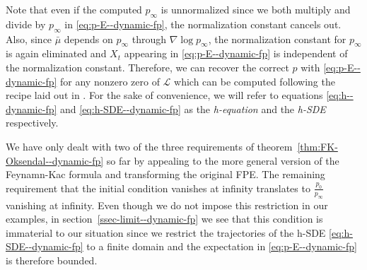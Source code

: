 Note that even if the computed $p_\infty$ is unnormalized since we both multiply and divide by $p_\infty$ in \eqref{eq:p-E--dynamic-fp}, the normalization constant cancels out. Also, since $\bar\mu$ depends on $p_\infty$ through $\nabla\log p_\infty$, the normalization constant for $p_\infty$ is again eliminated and $X_t$ appearing in \eqref{eq:p-E--dynamic-fp} is independent of the normalization constant. Therefore, we can recover the correct $p$ with \eqref{eq:p-E--dynamic-fp} for any nonzero zero of $\mathcal L$ which can be computed following the recipe laid out in \cite{mandal2023learning}. For the sake of convenience, we will refer to equations \eqref{eq:h--dynamic-fp} and \eqref{eq:h-SDE--dynamic-fp}  as the \textit{h-equation} and the \textit{h-SDE} respectively.

We have only dealt with two of the three requirements of theorem~\ref{thm:FK-Oksendal--dynamic-fp} so far by appealing to the more general version of the Feynamn-Kac formula \cite{xi2019jump} and transforming the original FPE. The remaining requirement that the initial condition vanishes at infinity translates to $\frac{p_0}{p_\infty}$ vanishing at infinity. Even though we do not impose this restriction in our examples, in section~\ref{ssec-limit--dynamic-fp} we see that this condition is immaterial to our situation since we restrict the trajectories of the h-SDE \eqref{eq:h-SDE--dynamic-fp} to a finite domain and the expectation in \eqref{eq:p-E--dynamic-fp} is therefore bounded. 


